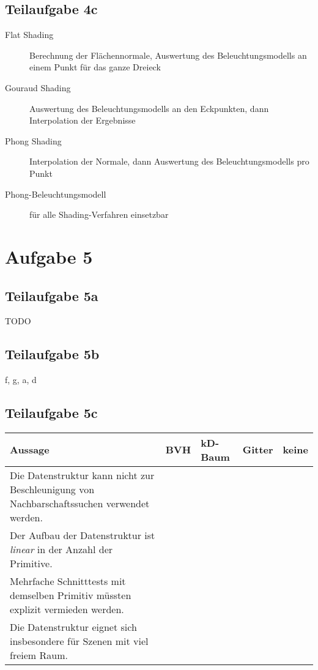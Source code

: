 \documentclass[a4paper]{scrartcl}
\begin{document}
\subsection*{Teilaufgabe 4c}
\begin{description}
	\item[Flat Shading] Berechnung der Flächennormale, Auswertung des Beleuchtungsmodells an einem Punkt für das ganze Dreieck
	\item[Gouraud Shading] Auswertung des Beleuchtungsmodells an den Eckpunkten, dann Interpolation der Ergebnisse
	\item[Phong Shading] Interpolation der Normale, dann Auswertung des Beleuchtungsmodells pro Punkt
	\item[Phong-Beleuchtungsmodell] für alle Shading-Verfahren einsetzbar
\end{description}

\section*{Aufgabe 5}
\subsection*{Teilaufgabe 5a}
TODO

\subsection*{Teilaufgabe 5b}
f, g, a, d

\subsection*{Teilaufgabe 5c}
\begin{tabular}{p{7cm}p{1.5cm}p{1.5cm}p{1.5cm}p{1.5cm}}\toprule
	\textbf{Aussage}                                                                           & \textbf{BVH} & \textbf{kD-Baum} & \textbf{Gitter} & \textbf{keine} \\\midrule
	Die Datenstruktur kann nicht zur Beschleunigung von Nachbarschaftssuchen verwendet werden. & \CheckedBox  & \CheckedBox      & \Square         & \Square        \\
	Der Aufbau der Datenstruktur ist \textit{linear} in der Anzahl der Primitive.              & \Square      & \Square          & \CheckedBox     & \Square        \\
	Mehrfache Schnitttests mit demselben Primitiv müssten explizit vermieden werden.           & \CheckedBox  & \CheckedBox      & \CheckedBox     & \Square        \\
	Die Datenstruktur eignet sich insbesondere für Szenen mit viel freiem Raum.                & \CheckedBox  & \CheckedBox      & \Square         & \Square        \\\bottomrule
\end{tabular}
\end{document}
